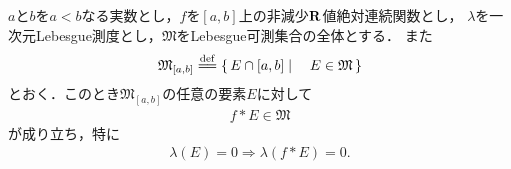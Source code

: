 	\begin{screen}
		\begin{thm}[$AC$は線型空間である]
		\end{thm}
	\end{screen}
	
	\begin{screen}
		\begin{thm}[絶対連続関数は有界変動である]
		\end{thm}
	\end{screen}
	
	\begin{screen}
		\begin{thm}[絶対連続な非減少関数は可測集合を可測集合に写す]
		\label{thm:absolutely_continuous_functions_map_measurable_set_to_measurable_set}
			$a$と$b$を$a<b$なる実数とし，$f$を$[a,b]$上の非減少$\mathbf{R}$値絶対連続関数とし，
			$\lambda$を一次元Lebesgue測度とし，$\mathfrak{M}$をLebesgue可測集合の全体とする．
			また
			\begin{align}
				\mathfrak{M}_{[a,b]} \defeq \Set{E \cap [a,b]}{E \in \mathfrak{M}}
			\end{align}
			とおく．このとき$\mathfrak{M}_{[a,b]}$の任意の要素$E$に対して
			\begin{align}
				f \ast E \in \mathfrak{M}
			\end{align}
			が成り立ち，特に
			\begin{align}
				\lambda(E) = 0 \Longrightarrow \lambda(f \ast E) = 0.
			\end{align}
		\end{thm}
	\end{screen}
	
